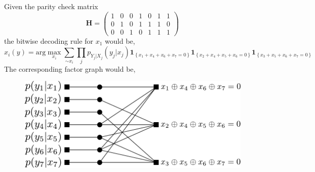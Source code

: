 Given the parity check matrix
\begin{equation}
\label{H_matrix}
 \textbf{H} = 
 \left(
\begin{array}{ccccccc}
1 & 0 & 0 & 1 & 0 & 1 & 1  \\
0 & 1 & 0 & 1 & 1 & 1 & 0  \\
0 & 0 & 1 & 0 & 1 & 1 & 1 
\end{array}
\right)
\end{equation}
the bitwise decoding rule for $x_1$ would be,
\begin{equation}
\hat x_i(y) = \text{arg} \max_{x_i}\sum_{\sim x_i}\prod_{j}p_{Y_j|X_j}(y_j|x_j)\mathbf{1}_{\left\lbrace x_1 + x_4 + x_6 + x_7 = 0\right\rbrace}\mathbf{1}_{\left\lbrace x_2 + x_4 + x_5 + x_6 = 0\right\rbrace}\mathbf{1}_{\left\lbrace x_3 + x_5 + x_6 + x_7 = 0\right\rbrace}
\end{equation} 
The corresponding factor graph would be,
\begin{figure}[htbp]
  \centering
  \includegraphics[scale=1]{factor_graph_channel}
\end{figure}